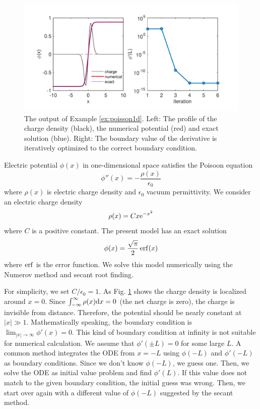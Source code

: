 \bigskip
\begin{example}\label{ex:poisson1d}


\begin{figure}
\centering
\includegraphics[width=5.5in]{06.ode2/poisson1d.pdf}
\caption{The output of Example \ref{ex:poisson1d}. Left: The profile of the charge density (black), the numerical potential (red) and exact solution (blue). Right: The boundary value of the derivative is iteratively optimized to the correct boundary condition.}
\label{fig:poisson1d}
\end{figure}

\medskip
\noindent
Electric potential $\phi(x)$ in one-dimensional space satisfies the Poisoon equation
\begin{equation}\label{eq:poisson1d}
\phi''(x) = -\frac{\rho(x)}{\epsilon_0}
\end{equation}
where $\rho(x)$ is electric charge density and $\epsilon_0$ vacuum permittivity.  We consider an electric charge density
\begin{equation}\label{eq:charge}
\rho(x) = C x \text{e}^{-x^2}
\end{equation}
where $C$ is a positive constant. The present model has an exact solution 
\begin{equation}
\phi(x) = \frac{\sqrt{\pi}}{2} \erf(x)
\end{equation}
where $\erf$ is the error function. We solve this model numerically using the Numerov method and secant root finding.

For simplicity, we set $C/\epsilon_0=1$.  As Fig. \ref{fig:poisson1d} shows the charge density is localized around $x=0$.
Since $\int_{-\infty}^{\infty} \rho(x) \text{d} x = 0$ (the net charge is zero), the charge is invisible from distance.  Therefore, the potential should be nearly constant at $|x| \gg 1$. Mathematically speaking, the boundary condition is $\displaystyle\lim_{|x| \rightarrow \infty} \phi'(x) = 0$.  This kind of boundary condition at infinity is not suitable for numerical calculation. We assume that $\phi'(\pm L) = 0$ for some large $L$.  A common method integrates the ODE from $x=-L$ using $\phi(-L)$ and $\phi'(-L)$ as boundary conditions.  Since we don't know $\phi(-L)$, we guess one.  Then, we solve the ODE as initial value problem and find $\phi'(L)$.  If this value does not match to the given boundary condition, the initial guess was wrong.  Then, we start over again with a different value of $\phi(-L)$ suggested by the secant method.  


\end{example}
